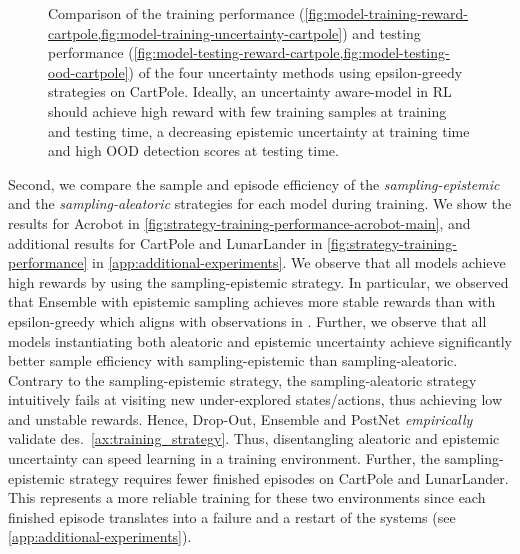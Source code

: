 \begin{figure}
\begin{subfigure}{.23\textwidth}
    \end{subfigure}
    \caption{Comparison of the training performance (\cref{fig:model-training-reward-cartpole,fig:model-training-uncertainty-cartpole}) and testing performance (\cref{fig:model-testing-reward-cartpole,fig:model-testing-ood-cartpole}) of the four uncertainty methods using epsilon-greedy strategies on CartPole. Ideally, an uncertainty aware-model in RL should achieve high reward with few training samples at training and testing time, a decreasing epistemic uncertainty at training time and high OOD detection scores at testing time.}
    \label{fig:model-training-testing-performance-cartpole-main}
\end{figure}

Second, we compare the sample and episode efficiency of the \emph{sampling-epistemic} and the \emph{sampling-aleatoric} strategies for each model during training. We show the results for Acrobot in \cref{fig:strategy-training-performance-acrobot-main}, and additional results for CartPole and LunarLander in \cref{fig:strategy-training-performance} in \cref{app:additional-experiments}. We observe that all models achieve high rewards by using the sampling-epistemic strategy. In particular, we observed that Ensemble with epistemic sampling achieves more stable rewards than with epsilon-greedy which aligns with observations in \citet{bootstrapped-dqn}. Further, we observe that all models instantiating both aleatoric and epistemic uncertainty achieve significantly better sample efficiency with sampling-epistemic than sampling-aleatoric. Contrary to the sampling-epistemic strategy, the sampling-aleatoric strategy intuitively fails at visiting new under-explored states/actions, thus achieving low and unstable rewards. Hence, Drop-Out, Ensemble and PostNet \emph{empirically} validate des.~\ref{ax:training_strategy}. Thus, disentangling aleatoric and epistemic uncertainty can speed learning in a training environment. Further, the sampling-epistemic strategy requires fewer finished episodes on CartPole and LunarLander. This represents a more reliable training for these two environments since each finished episode translates into a failure and a restart of the systems (see \cref{app:additional-experiments}).

%

% 
%


